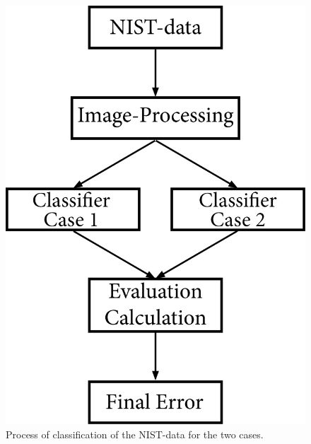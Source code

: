 \begin{figure}[H]
	\centering
\includegraphics[scale=0.65]{images/Process_Flow.jpg}
\caption{Process of classification of the NIST-data for the two cases.}
\label{fig:process_flow}
\end{figure}